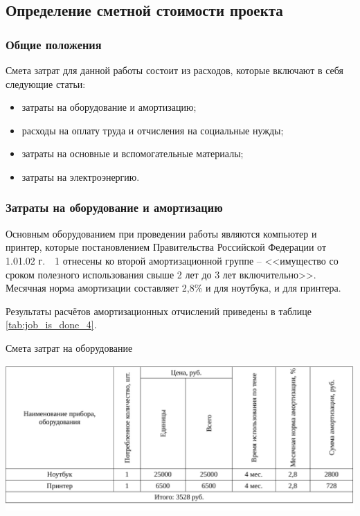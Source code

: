 \subsection{Определение сметной стоимости проекта}
\subsubsection{Общие положения}

Смета затрат для данной работы состоит из расходов, которые включают в себя следующие статьи:

\begin{itemize}
\item затраты на оборудование и амортизацию;
\item расходы на оплату труда и отчисления на социальные нужды;
\item затраты на основные и вспомогательные материалы;
\item затраты на электроэнергию.
\end{itemize}
\subsubsection{Затраты на оборудование и амортизацию}

Основным оборудованием при проведении работы являются компьютер и принтер, которые 
постановлением Правительства Российской Федерации от 1.01.02 г.~\textnumero~1 отнесены ко второй амортизационной группе – 
<<имущество со сроком полезного использования свыше 2 лет до 3 лет включительно>>. 
Месячная норма амортизации составляет 2,8\% и для ноутбука, и для принтера.

Результаты расчётов амортизационных отчислений приведены в таблице \ref{tab:job_is_done_4}.

\begin{table}[!ht]
\caption{Смета затрат на оборудование}
\centering
\includegraphics[page=1, width=1\linewidth]{tables/economics/schedule_4.pdf}
\label{tab:job_is_done_4}
\end{table}

